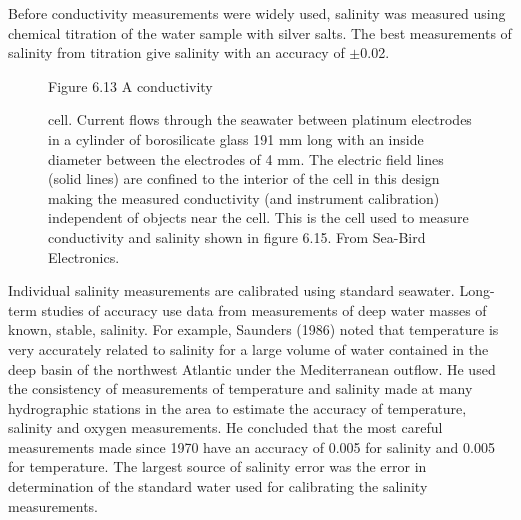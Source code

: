 Before conductivity measurements were widely used, salinity
was measured using chemical titration
of the water sample with silver salts. The best measurements of
salinity from titration give salinity with an
accuracy of $\pm$0.02.

\begin{figure}[t!]
\footnotesize
Figure 6.13 A conductivity \rule{0pt}{4ex}cell. Current flows through
the seawater between platinum electrodes in a cylinder of borosilicate
glass 191 mm long with an inside diameter between the electrodes of 4
mm. The electric field lines (solid lines) are confined to the
interior of the cell in this design making the measured conductivity
(and instrument calibration) independent of objects near the
cell. This is the cell used to measure conductivity and salinity shown
in figure 6.15. From Sea-Bird Electronics.
\label{fig:conductivity}
\vspace{-3ex}
\end{figure}

Individual salinity measurements are
calibrated using standard seawater. Long-term studies of
accuracy use data from measurements of deep
water masses of known, stable, salinity. For example, Saunders (1986)
noted that temperature is very accurately related to salinity for a
large volume of water contained in the deep basin of the northwest
Atlantic under the Mediterranean outflow. He used the consistency of
measurements of temperature and salinity made at many hydrographic
stations in the area to
estimate the accuracy of temperature,
salinity and oxygen measurements. He concluded that the most careful
measurements made since 1970 have an accuracy of 0.005 for salinity
and 0.005 for temperature. The largest source of salinity
error was the error in determination of the standard water used for
calibrating the salinity measurements.

